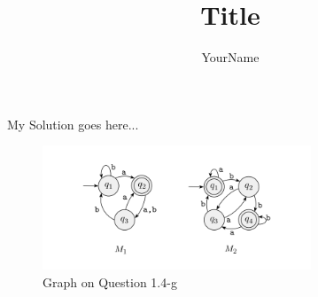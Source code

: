 \documentclass[12pt, a4paper]{article}
\begin{document}
\title{Title}
\author{YourName}
\date{} %
\maketitle


My Solution goes here...

\begin{figure}[h!]
  \centering
  \includegraphics[width=\linewidth, height=10.0em, keepaspectratio]{./img/p1.1.png}
  \caption{Graph on Question 1.4-g}
  \label{fig:DFStopo}
\end{figure}
\end{document}
